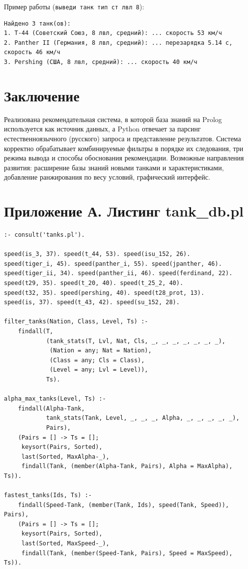 \documentclass[12pt,a4paper]{article}
\begin{document}
Пример работы (\texttt{выведи танк тип ст лвл 8}):
\begin{lstlisting}
Найдено 3 танк(ов):
1. Т-44 (Советский Союз, 8 лвл, средний): ... скорость 53 км/ч
2. Panther II (Германия, 8 лвл, средний): ... перезарядка 5.14 с, скорость 46 км/ч
3. Pershing (США, 8 лвл, средний): ... скорость 40 км/ч
\end{lstlisting}

\section*{Заключение}

Реализована рекомендательная система, в которой база знаний на Prolog используется как источник данных, а Python отвечает за парсинг естественноязычного (русского) запроса и представление результатов. Система корректно обрабатывает комбинируемые фильтры в порядке их следования, три режима вывода и способы обоснования рекомендации. Возможные направления развития: расширение базы знаний новыми танками и характеристиками, добавление ранжирования по весу условий, графический интерфейс.

\section*{Приложение А. Листинг tank\_db.pl}

\begin{lstlisting}
:- consult('tanks.pl').

speed(is_3, 37). speed(t_44, 53). speed(isu_152, 26).
speed(tiger_i, 45). speed(panther_i, 55). speed(jpanther, 46).
speed(tiger_ii, 34). speed(panther_ii, 46). speed(ferdinand, 22).
speed(t29, 35). speed(t_20, 40). speed(t_25_2, 40).
speed(t32, 35). speed(pershing, 40). speed(t28_prot, 13).
speed(is, 37). speed(t_43, 42). speed(su_152, 28).

filter_tanks(Nation, Class, Level, Ts) :-
    findall(T,
            (tank_stats(T, Lvl, Nat, Cls, _, _, _, _, _, _, _),
             (Nation = any; Nat = Nation),
             (Class = any; Cls = Class),
             (Level = any; Lvl = Level)),
            Ts).

alpha_max_tanks(Level, Ts) :-
    findall(Alpha-Tank,
            tank_stats(Tank, Level, _, _, _, Alpha, _, _, _, _, _),
            Pairs),
    (Pairs = [] -> Ts = [];
     keysort(Pairs, Sorted),
     last(Sorted, MaxAlpha-_),
     findall(Tank, (member(Alpha-Tank, Pairs), Alpha = MaxAlpha), Ts)).

fastest_tanks(Ids, Ts) :-
    findall(Speed-Tank, (member(Tank, Ids), speed(Tank, Speed)), Pairs),
    (Pairs = [] -> Ts = [];
     keysort(Pairs, Sorted),
     last(Sorted, MaxSpeed-_),
     findall(Tank, (member(Speed-Tank, Pairs), Speed = MaxSpeed), Ts)).
\end{lstlisting}
\end{document}
